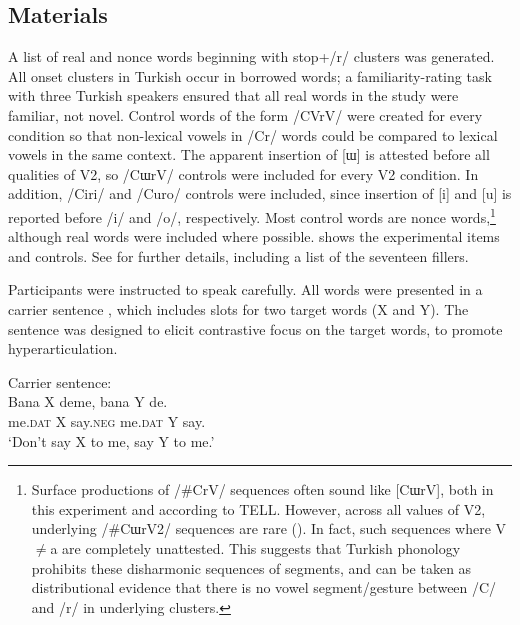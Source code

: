 \documentclass[output=paper,colorlinks,citecolor=brown]{langscibook}
\begin{document}
\subsection{Materials}
A list of real and nonce words beginning with stop+/r/ clusters was generated. All onset clusters in Turkish occur in borrowed words; a familiarity-rating task with three Turkish speakers ensured that all real words in the study were familiar, not novel. Control words of the form /CVrV/ were created for every condition so that non-lexical vowels in /Cr/ words could be compared to lexical vowels in the same context. The apparent insertion of [ɯ] is attested before all qualities of V2, so /CɯrV/ controls were included for every V2 condition. In addition, /Ciri/ and /Curo/ controls were included, since insertion of [i] and [u] is reported before /i/ and /o/, respectively. Most control words are nonce words,\footnote{Surface productions of /\#CrV/ sequences often sound like [CɯrV], both in this experiment and according to TELL. However, across all values of V2, underlying /\#CɯrV2/ sequences are rare (\citealt[ch. 5]{Bellik2019a}). In fact, such sequences where V${\neq}$a are completely unattested. This suggests that Turkish phonology prohibits these disharmonic sequences of segments, and can be taken as distributional evidence that there is no vowel segment/gesture between /C/ and /r/ in underlying clusters.} although real words were included where possible.  shows the experimental items and controls. See \citet[Ch.2]{Bellik2019a} for further details, including a list of the seventeen fillers.

Participants were instructed to speak carefully. All words were presented in a carrier sentence , which includes slots for two target words (X and Y). The sentence was designed to elicit contrastive focus on the target words, to promote hyperarticulation.

\begin{exe}
\ex \label{carrier} Carrier sentence:\\
\gll  Bana	X	deme, 		bana  	Y de.\\
me.\textsc{dat}	X 	say.\textsc{neg} me.\textsc{dat} Y say.\\
\glt `Don't say X to me, say Y to me.'
\end{exe}
\end{document}
